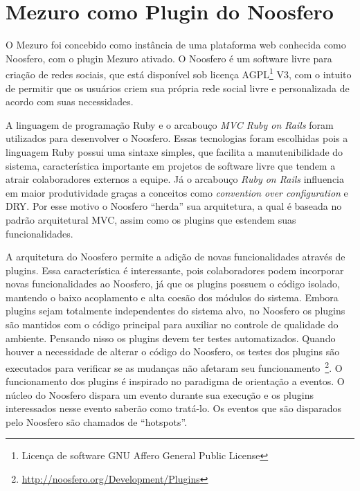 \section{Mezuro como Plugin do Noosfero}

O Mezuro foi concebido como instância de uma plataforma web conhecida como Noosfero, com o plugin Mezuro ativado. O Noosfero é um software livre para criação de redes sociais, que está disponível sob licença AGPL\footnote{Licença de software GNU Affero General Public License} V3, com o intuito de permitir que os usuários criem sua própria rede social livre e personalizada de acordo com suas necessidades.

A linguagem de programação Ruby e o arcabouço\textit{ MVC Ruby on Rails} foram utilizados para desenvolver o Noosfero. Essas tecnologias foram escolhidas pois a linguagem Ruby possui uma sintaxe simples, que facilita a manutenibilidade do sistema, característica importante em projetos de software livre que tendem a atrair colaboradores externos a equipe. Já o arcabouço \textit{Ruby on Rails} influencia em maior produtividade graças a conceitos como \textit{convention over configuration} e DRY. Por esse motivo o Noosfero ``herda'' sua arquitetura, a qual é baseada no padrão arquitetural MVC, assim como os plugins que estendem suas funcionalidades.

A arquitetura do Noosfero permite a adição de novas funcionalidades através de plugins. Essa característica é interessante, pois colaboradores podem incorporar novas funcionalidades ao Noosfero, já que os plugins possuem o código isolado, mantendo o baixo acoplamento e alta coesão dos módulos do sistema.
%
Embora plugins sejam totalmente independentes do sistema alvo, no Noosfero os plugins são mantidos com o código principal para auxiliar no controle de qualidade do ambiente. Pensando nisso os plugins devem ter testes automatizados. Quando houver a necessidade de alterar o código do Noosfero, os testes dos plugins são executados para verificar se as mudanças não afetaram seu funcionamento~\footnote{\url{http://noosfero.org/Development/Plugins}}.
%
O funcionamento dos plugins é inspirado no paradigma de orientação a eventos. O núcleo do Noosfero dispara um evento durante sua execução e os plugins interessados nesse evento saberão como tratá-lo. Os eventos que são disparados pelo Noosfero são chamados de “hotspots”.

